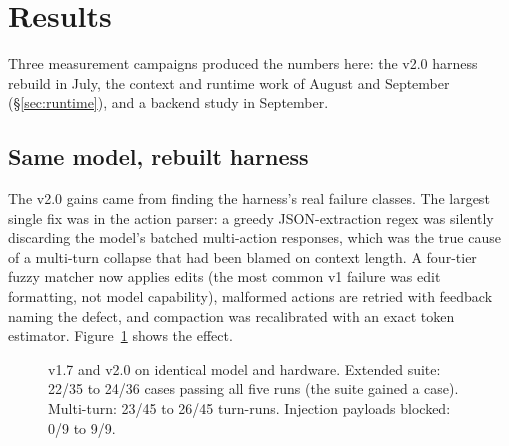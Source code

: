 \documentclass[11pt]{article}
\begin{document}
\section{Results}

Three measurement campaigns produced the numbers here: the v2.0 harness
rebuild in July, the context and runtime work of August and September
(\S\ref{sec:runtime}), and a backend study in September.

\subsection{Same model, rebuilt harness}

The v2.0 gains came from finding the harness's real failure classes. The
largest single fix was in the action parser: a greedy JSON-extraction regex
was silently discarding the model's batched multi-action responses, which
was the true cause of a multi-turn collapse that had been blamed on context
length. A four-tier fuzzy matcher now applies edits (the most common v1
failure was edit formatting, not model capability), malformed actions are
retried with feedback naming the defect, and compaction was recalibrated
with an exact token estimator. Figure~\ref{fig:evals} shows the effect.

\begin{figure}[ht]
\centering
{}
\caption{v1.7 and v2.0 on identical model and hardware. Extended suite:
22/35 to 24/36 cases passing all five runs (the suite gained a case).
Multi-turn: 23/45 to 26/45 turn-runs. Injection payloads blocked: 0/9 to
9/9.}
\label{fig:evals}
\end{figure}
\end{document}
